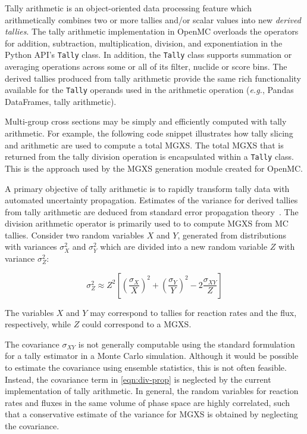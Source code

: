 Tally arithmetic is an object-oriented data processing feature which arithmetically combines two or more tallies and/or scalar values into new \emph{derived tallies}. The tally arithmetic implementation in OpenMC overloads the operators for addition, subtraction, multiplication, division, and exponentiation in the Python API's \texttt{Tally} class. In addition, the \texttt{Tally} class supports summation or averaging operations across some or all of its filter, nuclide or score bins. The derived tallies produced from tally arithmetic provide the same rich functionality available for the \texttt{Tally} operands used in the arithmetic operation (\textit{e.g.}, Pandas DataFrames, tally arithmetic).

Multi-group cross sections may be simply and efficiently computed with tally arithmetic. For example, the following code snippet illustrates how tally slicing and arithmetic are used to compute a total MGXS. The total MGXS that is returned from the tally division operation is encapsulated within a \texttt{Tally} class. This is the approach used by the MGXS generation module created for OpenMC.



A primary objective of tally arithmetic is to rapidly transform tally data with automated uncertainty propagation. Estimates of the variance for derived tallies from tally arithmetic are deduced from standard error propagation theory~\cite{bevington2003data}. The division arithmetic operator is primarily used to to compute MGXS from MC tallies. Consider two random variables $X$ and $Y$, generated from distributions with variances $\sigma_{X}^2$ and $\sigma_{Y}^2$ which are divided into a new random variable $Z$ with variance $\sigma_{Z}^2$:

\begin{equation}
\label{eqn:div-prop}
\sigma_{Z}^{2} \approx Z^{2}\left[\left(\frac{\sigma_{X}}{X}\right)^{2} + \left(\frac{\sigma_{Y}}{Y}\right)^{2} - 2\frac{\sigma_{XY}}{Z}\right]
\end{equation}

\noindent The variables $X$ and $Y$ may correspond to tallies for reaction rates and the flux, respectively, while $Z$ could correspond to a MGXS.

The covariance $\sigma_{XY}$ is not generally computable using the standard formulation for a tally estimator in a Monte Carlo simulation. Although it would be possible to estimate the covariance using ensemble statistics, this is not often feasible. Instead, the covariance term in \cref{eqn:div-prop} is neglected by the current implementation of tally arithmetic. In general, the random variables for reaction rates and fluxes in the same volume of phase space are highly correlated, such that a conservative estimate of the variance for MGXS is obtained by neglecting the covariance.

